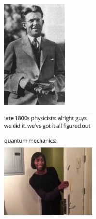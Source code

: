 \begin{figure}[ht]
    \centering
    \begin{minipage}{.5\textwidth}
        \centering
        \includegraphics[height=5.5cm]{Images1/cyclo.PNG}
        \label{fig:lawrence_cyclo}
    \end{minipage}%
    \begin{minipage}{.5\textwidth}
        \centering
        \includegraphics[height=5.5cm]{Images1/mama.png}
        \label{fig:to_be_continued}
    \end{minipage}
\end{figure}

